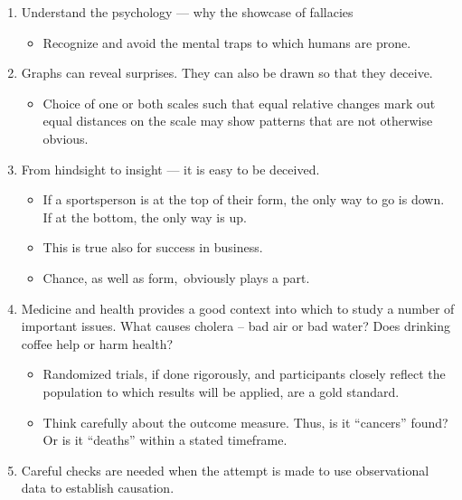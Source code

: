 \documentclass[
  10ptls,
  b5paper]{book}
\providecommand{\tightlist}{%
  \setlength{\itemsep}{0pt}\setlength{\parskip}{0pt}}
\begin{document}
\begin{enumerate}
\def\labelenumi{\arabic{enumi}.}
\tightlist
\item
  Understand the psychology --- why the showcase of fallacies

  \begin{itemize}
  \tightlist
  \item
    Recognize and avoid the mental traps to which humans are prone.
  \end{itemize}
\item
  Graphs can reveal surprises. They can also be drawn
  so that they deceive.

  \begin{itemize}
  \tightlist
  \item
    Choice of one or both scales such that equal relative
    changes mark out equal distances on the scale may show
    patterns that are not otherwise obvious.
  \end{itemize}
\item
  From hindsight to insight --- it is easy to be deceived.

  \begin{itemize}
  \tightlist
  \item
    If a sportsperson is at the top of their form, the only
    way to go is down. If at the bottom, the only way is up.
  \item
    This is true also for success in business.
  \item
    Chance, as well as form,~obviously plays a part.
  \end{itemize}
\item
  Medicine and health provides a good context into which to study
  a number of important issues. What causes cholera -- bad air or bad water?
  Does drinking coffee help or harm health?

  \begin{itemize}
  \tightlist
  \item
    Randomized trials, if done rigorously, and participants
    closely reflect the population to which results will be applied,
    are a gold standard.
  \item
    Think carefully about the outcome measure. Thus, is it
    ``cancers'' found? Or is it ``deaths'' within a stated timeframe.
  \end{itemize}
\item
  Careful checks are needed when the attempt is made to use
  observational data to establish causation.


\end{enumerate}
\end{document}
